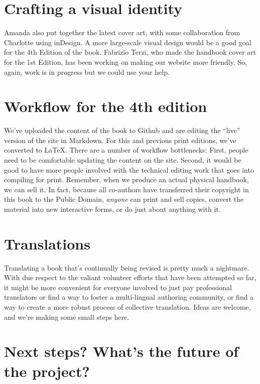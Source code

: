 \section*{Crafting a visual identity}\label{crafting-a-visual-identity}

Amanda also put together the latest cover art, with some collaboration
from Charlotte using inDesign.  A more large-scale visual design would be
a good goal for the 4th Edition of the book. Fabrizio Terzi, who made
the handbook cover art for the 1st Edition, has been working on
making our website more friendly.  So, again, work is in progress but we
could use your help.

\section*{Workflow for the 4th
edition}\label{workflow-for-the-4th-edition}

We've uploaded the content of the book to Github and are editing the
``live'' version of the site in Markdown. For this and previous print editions,
we've converted to LaTeX. There are a number of workflow bottlenecks:
First, people need to be comfortable updating the content on the site.
Second, it would be good to have more people involved with the technical
editing work that goes into compiling for print. Remember, when we
produce an actual physical handbook, we can sell it. In fact, because
all co-authors have transferred their copyright in this book to the
Public Domain, \emph{anyone} can print and sell copies, convert the
material into new interactive forms, or do just about anything with it.

\section*{Translations}\label{translations}

Translating a book that’s continually being revised is pretty much a nightmare. With due respect to the valiant volunteer efforts that have been attempted so far, it might be more convenient for everyone involved to just pay professional translators or find a way to foster a multi-lingual authoring community, or find a way to create a more robust process of collective translation. Ideas are welcome, and we’re making some small steps here. 

\section*{Next steps? What's the future of the
project?}\label{next-steps-whats-the-future-of-the-project}

